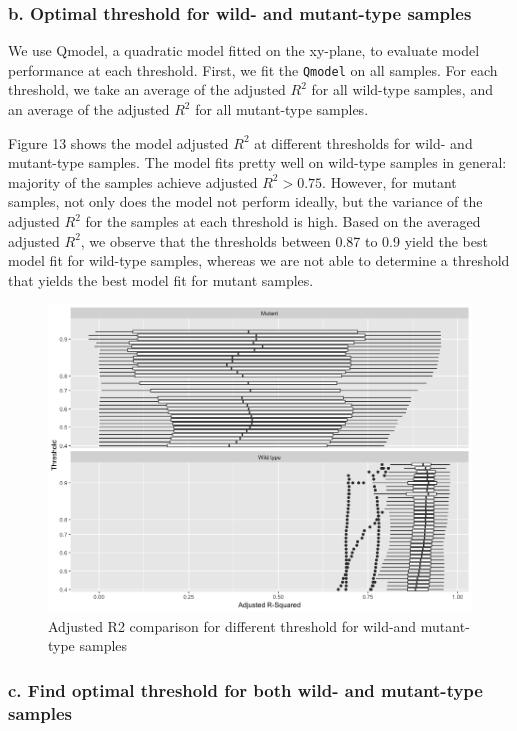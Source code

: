 \documentclass[10pt,letterpaper]{article}
\begin{document}
\hypertarget{b.-optimal-threshold-for-wild--and-mutant-type-samples}{%
\subsubsection{b. Optimal threshold for wild- and mutant-type
samples}\label{b.-optimal-threshold-for-wild--and-mutant-type-samples}}

We use Qmodel, a quadratic model fitted on the xy-plane, to evaluate
model performance at each threshold. First, we fit the \texttt{Qmodel}
on all samples. For each threshold, we take an average of the adjusted
\(R^2\) for all wild-type samples, and an average of the adjusted
\(R^2\) for all mutant-type samples.

Figure 13 shows the model adjusted \(R^2\) at different thresholds for
wild- and mutant-type samples. The model fits pretty well on wild-type
samples in general: majority of the samples achieve adjusted
\(R^2 > 0.75\). However, for mutant samples, not only does the model not
perform ideally, but the variance of the adjusted \(R^2\) for the
samples at each threshold is high. Based on the averaged adjusted
\(R^2\), we observe that the thresholds between 0.87 to 0.9 yield the
best model fit for wild-type samples, whereas we are not able to
determine a threshold that yields the best model fit for mutant samples.

\begin{figure}[H]
\includegraphics[width=0.9\linewidth]{visualization_paper/threshold_boxplot} \caption{Adjusted R2 comparison for different threshold for wild-and mutant-type samples}\label{fig:Figure13}
\end{figure}

\hypertarget{c.-find-optimal-threshold-for-both-wild--and-mutant-type-samples}{%
\subsubsection{c. Find optimal threshold for both wild- and mutant-type
samples}\label{c.-find-optimal-threshold-for-both-wild--and-mutant-type-samples}}
\end{document}
